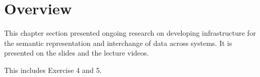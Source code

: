 \section{Overview}

This chapter section presented ongoing research on developing infrastructure for the semantic representation and interchange of data across systems.
It is presented on the slides and the lecture videos.

This includes Exercise 4 and 5.

%
%
